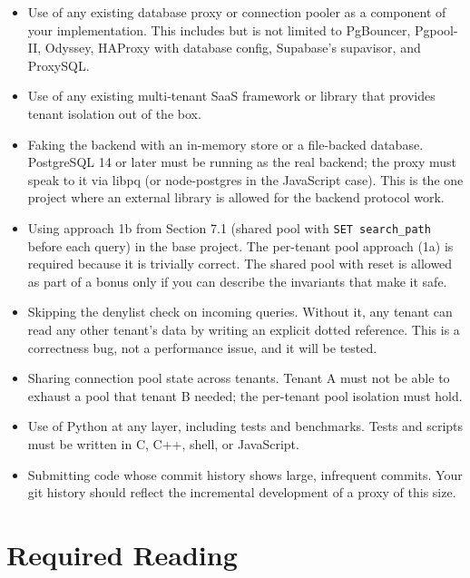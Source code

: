 \documentclass[11pt,a4paper]{article}
\begin{document}
\begin{notebox}
\begin{itemize}
\item Use of any existing database proxy or connection pooler as a component of your implementation. This includes but is not limited to PgBouncer, Pgpool-II, Odyssey, HAProxy with database config, Supabase's supavisor, and ProxySQL.

\item Use of any existing multi-tenant SaaS framework or library that provides tenant isolation out of the box.

\item Faking the backend with an in-memory store or a file-backed database. PostgreSQL 14 or later must be running as the real backend; the proxy must speak to it via libpq (or node-postgres in the JavaScript case). This is the one project where an external library is allowed for the backend protocol work.

\item Using approach 1b from Section 7.1 (shared pool with \texttt{SET search\_path} before each query) in the base project. The per-tenant pool approach (1a) is required because it is trivially correct. The shared pool with reset is allowed as part of a bonus only if you can describe the invariants that make it safe.

\item Skipping the denylist check on incoming queries. Without it, any tenant can read any other tenant's data by writing an explicit dotted reference. This is a correctness bug, not a performance issue, and it will be tested.

\item Sharing connection pool state across tenants. Tenant A must not be able to exhaust a pool that tenant B needed; the per-tenant pool isolation must hold.

\item Use of Python at any layer, including tests and benchmarks. Tests and scripts must be written in C, C++, shell, or JavaScript.

\item Submitting code whose commit history shows large, infrequent commits. Your git history should reflect the incremental development of a proxy of this size.
\end{itemize}
\end{notebox}

\section{Required Reading}
\end{document}
